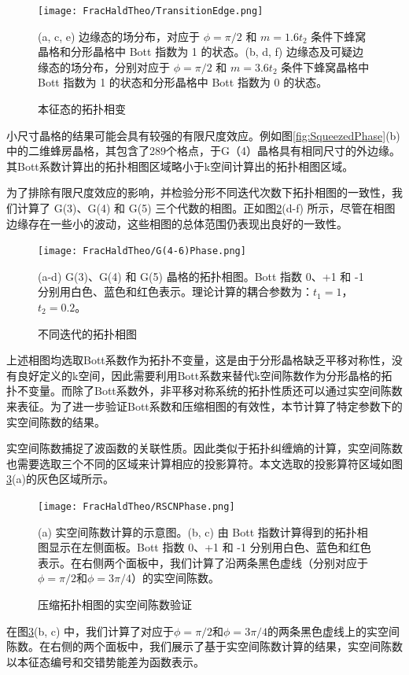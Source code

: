 \begin{figure}[htbp]
    \centering
    \texttt{[image: FracHaldTheo/TransitionEdge.png]}
    \caption{本征态的拓扑相变}(a, c, e) 边缘态的场分布，对应于 $\phi = \pi/2$ 和 $m = 1.6t_2$ 条件下蜂窝晶格和分形晶格中 Bott 指数为 1 的状态。(b, d, f) 边缘态及可疑边缘态的场分布，分别对应于 $\phi = \pi/2$ 和 $m = 3.6t_2$ 条件下蜂窝晶格中 Bott 指数为 1 的状态和分形晶格中 Bott 指数为 0 的状态。
    \label{fig:TransitionEdge}
\end{figure}

小尺寸晶格的结果可能会具有较强的有限尺度效应。例如图\ref{fig:SqueezedPhase}(b)中的二维蜂房晶格，其包含了289个格点，于G（4）晶格具有相同尺寸的外边缘。其Bott系数计算出的拓扑相图区域略小于k空间计算出的拓扑相图区域。

为了排除有限尺度效应的影响，并检验分形不同迭代次数下拓扑相图的一致性，我们计算了 G(3)、G(4) 和 G(5) 三个代数的相图。正如图\ref{fig:G(4-6)Phase}(d-f) 所示，尽管在相图边缘存在一些小的波动，这些相图的总体范围仍表现出良好的一致性。

\begin{figure}[htbp]
    \centering
    \texttt{[image: FracHaldTheo/G(4-6)Phase.png]}
    \caption{不同迭代的拓扑相图}(a-d) G(3)、G(4) 和 G(5) 晶格的拓扑相图。Bott 指数 0、+1 和 -1 分别用白色、蓝色和红色表示。理论计算的耦合参数为：$t_1 = 1$，$t_2 = 0.2$。
    \label{fig:G(4-6)Phase}
\end{figure}

上述相图均选取Bott系数作为拓扑不变量，这是由于分形晶格缺乏平移对称性，没有良好定义的k空间，因此需要利用Bott系数来替代k空间陈数作为分形晶格的拓扑不变量。而除了Bott系数外，非平移对称系统的拓扑性质还可以通过实空间陈数来表征。为了进一步验证Bott系数和压缩相图的有效性，本节计算了特定参数下的实空间陈数的结果。

实空间陈数捕捉了波函数的关联性质。因此类似于拓扑纠缠熵的计算，实空间陈数也需要选取三个不同的区域来计算相应的投影算符。本文选取的投影算符区域如图\ref{fig:RSCNPhase}(a)的灰色区域所示。 

\begin{figure}[htbp]
    \centering
    \texttt{[image: FracHaldTheo/RSCNPhase.png]}
    \caption{压缩拓扑相图的实空间陈数验证}(a) 实空间陈数计算的示意图。(b, c) 由 Bott 指数计算得到的拓扑相图显示在左侧面板。Bott 指数 0、+1 和 -1 分别用白色、蓝色和红色表示。在右侧两个面板中，我们计算了沿两条黑色虚线（分别对应于$\phi=\pi/2$和$\phi=3\pi/4$）的实空间陈数。
    \label{fig:RSCNPhase}
\end{figure}

在图\ref{fig:RSCNPhase}(b, c) 中，我们计算了对应于$\phi=\pi/2$和$\phi=3\pi/4$的两条黑色虚线上的实空间陈数。在右侧的两个面板中，我们展示了基于实空间陈数计算的结果，实空间陈数以本征态编号和交错势能差为函数表示。

